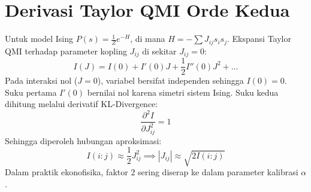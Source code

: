 \section{Derivasi Taylor QMI Orde Kedua}
Untuk model Ising $P(s) = \frac{1}{Z} e^{-H}$, di mana $H = -\sum J_{ij} s_i s_j$.
Ekspansi Taylor QMI terhadap parameter kopling $J_{ij}$ di sekitar $J_{ij}=0$:
\begin{equation}
I(J) = I(0) + I'(0) J + \frac{1}{2} I''(0) J^2 + \dots
\end{equation}
Pada interaksi nol ($J=0$), variabel bersifat independen sehingga $I(0) = 0$.
Suku pertama $I'(0)$ bernilai nol karena simetri sistem Ising.
Suku kedua dihitung melalui derivatif KL-Divergence:
\begin{equation}
\frac{\partial^2 I}{\partial J_{ij}^2} = 1
\end{equation}
Sehingga diperoleh hubungan aproksimasi:
\begin{equation}
I(i:j) \approx \frac{1}{2} J_{ij}^2 \implies |J_{ij}| \approx \sqrt{2 I(i:j)}
\end{equation}
Dalam praktik ekonofisika, faktor 2 sering diserap ke dalam parameter kalibrasi $\alpha$.
